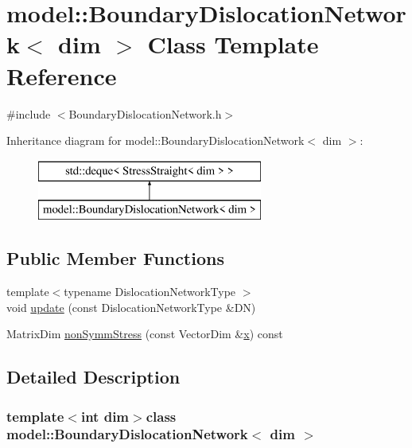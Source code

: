 \hypertarget{classmodel_1_1_boundary_dislocation_network}{}\section{model\+:\+:Boundary\+Dislocation\+Network$<$ dim $>$ Class Template Reference}
\label{classmodel_1_1_boundary_dislocation_network}


{\ttfamily \#include $<$Boundary\+Dislocation\+Network.\+h$>$}

Inheritance diagram for model\+:\+:Boundary\+Dislocation\+Network$<$ dim $>$\+:\begin{figure}[H]
\begin{center}
\leavevmode
\includegraphics[height=2.000000cm]{classmodel_1_1_boundary_dislocation_network}
\end{center}
\end{figure}
\subsection*{Public Member Functions}
\begin{DoxyCompactItemize}
\item 
{\footnotesize template$<$typename Dislocation\+Network\+Type $>$ }\\void \hyperlink{classmodel_1_1_boundary_dislocation_network_a433df893acd9510e16aa302a9b2c7d25}{update} (const Dislocation\+Network\+Type \&D\+N)
\item 
Matrix\+Dim \hyperlink{classmodel_1_1_boundary_dislocation_network_a278987a9fc2e78b36f216e9ad167888b}{non\+Symm\+Stress} (const Vector\+Dim \&\hyperlink{generate_s_t_lcyl_8m_a9336ebf25087d91c818ee6e9ec29f8c1}{x}) const 
\end{DoxyCompactItemize}


\subsection{Detailed Description}
\subsubsection*{template$<$int dim$>$class model\+::\+Boundary\+Dislocation\+Network$<$ dim $>$}



